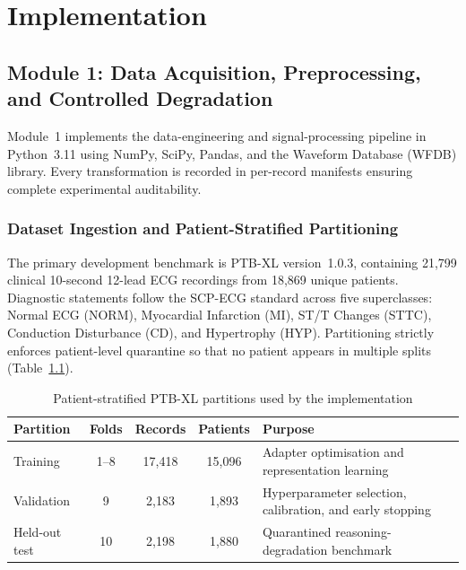 \documentclass{ssnreview}
\begin{document}
\chapter{Implementation}

\section{Module 1: Data Acquisition, Preprocessing, and Controlled Degradation}

Module~1 implements the data-engineering and signal-processing pipeline in Python~3.11 using
NumPy, SciPy, Pandas, and the Waveform Database (WFDB) library. Every transformation is recorded
in per-record manifests ensuring complete experimental auditability.

\subsection{Dataset Ingestion and Patient-Stratified Partitioning}

The primary development benchmark is PTB-XL version~1.0.3, containing 21,799 clinical 10-second
12-lead ECG recordings from 18,869 unique patients. Diagnostic statements follow the SCP-ECG
standard across five superclasses: Normal ECG (\textsc{NORM}), Myocardial Infarction
(\textsc{MI}), ST/T Changes (\textsc{STTC}), Conduction Disturbance (\textsc{CD}), and
Hypertrophy (\textsc{HYP}). Partitioning strictly enforces patient-level quarantine so that no
patient appears in multiple splits (Table~\ref{tab:ptbxl-splits}).

\begin{table}[H]
  \centering
  \small
  \caption{Patient-stratified PTB-XL partitions used by the implementation}
  \label{tab:ptbxl-splits}
  \begin{tabularx}{\textwidth}{@{}lccc>{\raggedright\arraybackslash}X@{}}
    \toprule
    \textbf{Partition} & \textbf{Folds} & \textbf{Records} &
    \textbf{Patients} & \textbf{Purpose} \\
    \midrule
    Training & 1--8 & 17,418 & 15,096 &
    Adapter optimisation and representation learning \\
    Validation & 9 & 2,183 & 1,893 &
    Hyperparameter selection, calibration, and early stopping \\
    Held-out test & 10 & 2,198 & 1,880 &
    Quarantined reasoning-degradation benchmark \\
    \bottomrule
  \end{tabularx}
\end{table}
\end{document}
